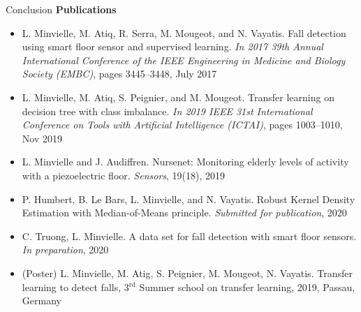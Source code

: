 \begin{frame}{Conclusion}
\centering
\textbf{Publications}
\begin{itemize}
    \small
    \item L. Minvielle, M. Atiq, R. Serra, M. Mougeot, and N. Vayatis. \textcolor{myblue}{Fall detection using smart floor sensor and supervised learning.}
\textit{In 2017 39th Annual International Conference of the IEEE Engineering in Medicine and Biology Society (EMBC)}, pages
3445–3448, July 2017
    \item L. Minvielle, M. Atiq, S. Peignier, and M. Mougeot. \textcolor{myblue}{Transfer learning on decision tree with class imbalance.}
\textit{In 2019 IEEE 31st International Conference on Tools with Artificial Intelligence (ICTAI)}, pages 1003–1010, Nov 2019
    \item L. Minvielle and J. Audiffren. \textcolor{myblue}{Nursenet: Monitoring elderly levels of activity with a piezoelectric floor.}
\textit{Sensors}, 19(18), 2019
    \item P. Humbert, B. Le Bars, L. Minvielle, and N. Vayatis. \textcolor{myblue}{Robust Kernel Density Estimation with Median-of-Means principle}. \textit{Submitted for publication}, 2020
    \item C. Truong, L. Minvielle. \textcolor{myblue}{A data set for fall detection with smart floor sensors.} \textit{In preparation}, 2020
    \item (Poster) L. Minvielle, M. Atig, S. Peignier, M. Mougeot, N. Vayatis. \textcolor{myblue}{Transfer learning to detect falls}, 3$^{\text{rd}}$ Summer school on transfer learning, 2019, Passau, Germany 
\end{itemize}


\vfill
\end{frame}
